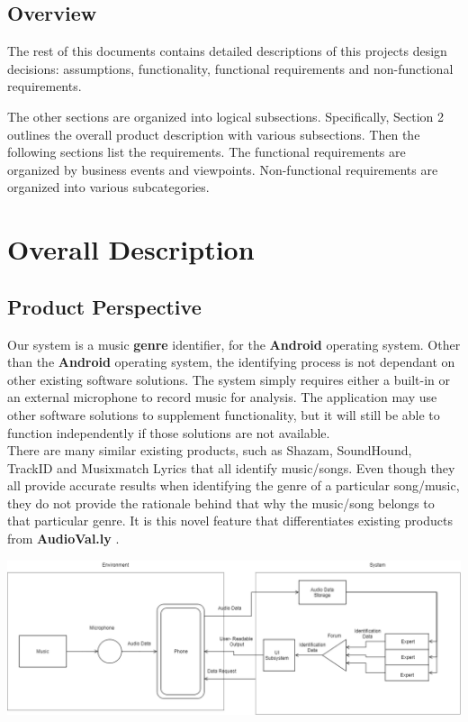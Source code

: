 \documentclass[]{article}
\begin{document}
\subsection{Overview}
\label{sub:overview}
The rest of this documents contains detailed descriptions of this projects design decisions: assumptions, functionality, functional requirements and non-functional requirements.

The other sections are organized into logical subsections. Specifically, Section 2 outlines the overall product description with various subsections. Then the following sections list the requirements. The functional requirements are organized by business events and viewpoints. Non-functional requirements are organized into various subcategories.

\newpage
\section{Overall Description}
\label{sec:overall_description}
\subsection{Product Perspective}
\label{sub:product_perspective}
Our system is a music \textbf{genre} identifier, for the \textbf{Android} operating system. Other than the \textbf{Android} operating system, the identifying process is not dependant on other existing software solutions. The system simply requires either a built-in or an external microphone to record music for analysis. The application may use other software solutions to supplement functionality, but it will still be able to function independently if those solutions are not available. 
\\
There are many similar existing products, such as Shazam, SoundHound, TrackID and Musixmatch Lyrics that all identify music/songs. Even though they all provide accurate results when identifying the genre of a particular song/music, they do not provide the rationale behind that why the music/song belongs to that particular genre. It is this novel feature that differentiates existing products from \textbf{AudioVal.ly} .

\includegraphics[scale=0.4]{Diag1}
\end{document}
